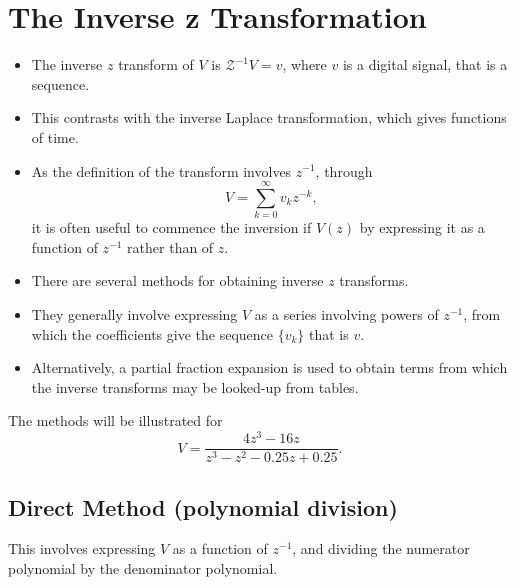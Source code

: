 \section*{The Inverse z Transformation}
\begin{slide}\label{slide:l8s4}
   \begin{itemize}
   \item The inverse $z$ transform of $V$ is $\mathcal{Z}^{-1} V = v$,
     where $v$ is a digital signal, that is a sequence.
   \item This contrasts with the inverse Laplace transformation, which
     gives functions of time.
   \item As the definition of the transform involves $z^{-1}$, through
     \[V=\sum_{k=0}^{\infty} v_k z^{-k},\] it is often useful to
     commence the inversion if $V(z)$ by expressing it as a function of
     $z^{-1}$ rather than of $z$.
   \end{itemize}
\end{slide}

\begin{slide}\label{slide:l8s5}
   \begin{itemize}
   \item There are several methods for obtaining inverse $z$
     transforms.
   \item They generally involve expressing $V$ as a series involving
     powers of $z^{-1}$, from which the coefficients give the sequence
     $\{v_k\}$ that is $v$.
   \item Alternatively, a partial fraction expansion is used to obtain
     terms from which the inverse transforms may be looked-up from tables.
   \end{itemize}
\end{slide}

The methods will be illustrated for \[V=\frac{4z^3 - 16z}{z^3 - z^2 -
  0.25 z + 0.25}.\]

\subsection*{Direct Method (polynomial division)}
This involves expressing $V$ as a function of $z^{-1}$, and
dividing the numerator polynomial by the denominator polynomial.

